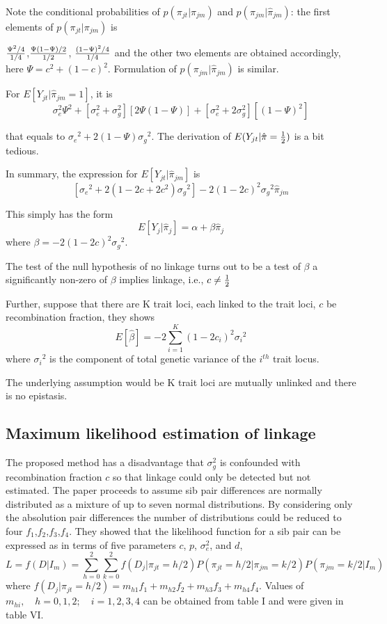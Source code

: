   Note the conditional probabilities of $p(\pi_{jt}|\pi_{jm})$ and
$p(\pi_{jm}|\hat{\pi}_{jm})$: the first elements of $p(\pi_{jt}|\pi_{jm})$ is

  ${\Psi^2/4}\over {1/4}$,$ {{\Psi (1-\Psi)/2}\over{1/2}}$,
  ${{{{(1-\Psi)}^2}/4}\over{1/4}}$ and the other two elements are obtained
accordingly, here $\Psi=c^2+{(1-c)}^2$. Formulation of
$p(\pi_{jm}|\hat{\pi}_{jm})$ is similar.

  For $E[Y_{jt}|\hat{\pi}_{jm}=1]$, it is
  $$\sigma^2_e\Psi^2+[\sigma^2_e+\sigma^2_g]
[2\Psi(1-\Psi)]+[\sigma^2_e+2\sigma^2_g][{(1-\Psi)}^2] $$

that equals to ${\sigma_e}^2+2(1-\Psi){\sigma_g}^2$.  The derivation of
$E(Y_{jt}|\hat{\pi}={1\over2})$ is a bit tedious.

  In summary, the expression for $E[Y_{jt}|\hat{\pi}_{jm}]$ is
  $$[{\sigma_e}^2+2(1-2c+2c^2){\sigma_g}^2]-2{(1-2c)}^2{\sigma_g}^2\hat{\pi}_{jm}
$$

  This simply has the form
  $$E[Y_j|\hat{\pi}_j]=\alpha+\beta \hat{\pi}_j$$
  where  $\beta=-2{(1-2c)}^2{\sigma_g}^2$.

  The test of the null hypothesis of no linkage turns out to be a
test of $\beta $
a significantly non-zero of $\beta$ implies linkage, i.e., $c\ne {1\over2}$

  Further, suppose that there are K trait loci, each linked to the
trait loci, $c$ be recombination fraction, they shows
  $$E[\hat{\beta}]=-2\sum_{i=1}^K {(1-2c_i)}^2{\sigma_i}^2$$
  where ${\sigma_i}^2$ is the component of total genetic variance of the
$i^{th}$ trait locus.

  The underlying assumption would be K trait loci are mutually
unlinked and there is no epistasis.

\subsection{Maximum likelihood estimation of linkage}
The proposed method has a disadvantage that $\sigma_g^2$ is confounded with
recombination fraction $c$ so that linkage could only be detected but not
estimated. The paper proceeds to assume sib pair differences are normally
distributed as a mixture of up to seven normal distributions. By considering
only the absolution pair differences the number of distributions could be 
reduced to four $f_1$,$f_2$,$f_3$,$f_4$. They showed that the likelihood 
function for a sib pair can be expressed as in terms of five parameters $c$, 
$p$, $\sigma_e^2$, and $d$,
$$L=f(D|I_m)=\sum\limits_{h=0}^2\sum\limits_{k=0}^2f(D_j|\pi_{jt}=h/2)
P(\pi_{jt}=h/2|\pi_{jm}=k/2)P(\pi_{jm}=k/2|I_m)$$
where $f(D_j|\pi_{jt}=h/2)=m_{h1}f_1+m_{h2}f_2+m_{h3}f_3+m_{h4}f_4$.
Values of $m_{hi}, \quad h=0,1,2;\quad i=1,2,3,4$ can be obtained from 
table I and were given in table VI.

